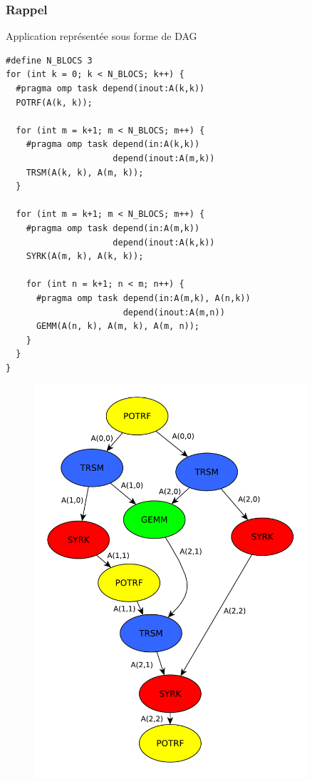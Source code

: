 \documentclass[xcolor={usenames,dvipsnames,svgnames,table}, aspectratio=43]{beamer}
\begin{document}
\begin{frame}[fragile]
\frametitle{Rappel}

Application représentée sous forme de DAG

  \begin{minipage}[t]{0.46\linewidth}
  \begin{lstlisting}
#define N_BLOCS 3
for (int k = 0; k < N_BLOCS; k++) {
  #pragma omp task depend(inout:A(k,k))
  POTRF(A(k, k));

  for (int m = k+1; m < N_BLOCS; m++) {
    #pragma omp task depend(in:A(k,k))
                     depend(inout:A(m,k))
    TRSM(A(k, k), A(m, k));
  }

  for (int m = k+1; m < N_BLOCS; m++) {
    #pragma omp task depend(in:A(m,k))
                     depend(inout:A(k,k))
    SYRK(A(m, k), A(k, k));

    for (int n = k+1; n < m; n++) {
      #pragma omp task depend(in:A(m,k), A(n,k))
                       depend(inout:A(m,n))
      GEMM(A(n, k), A(m, k), A(m, n));
    }
  }
}
  \end{lstlisting}
  \end{minipage}
  \begin{minipage}[t]{0.46\linewidth}
    \vspace{-0.3cm}
    \begin{figure}
      \includegraphics[width=0.9\textwidth]{graph/anim-dag/anim-8.pdf}%
    \end{figure}
  \end{minipage}


\end{frame}
\end{document}
